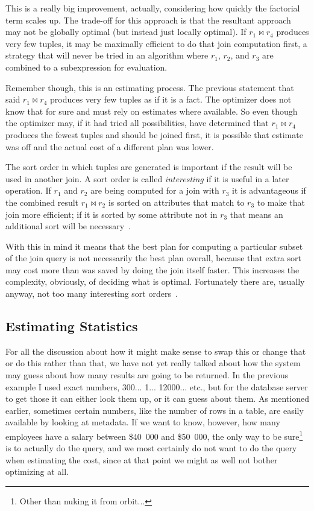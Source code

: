 This is a really big improvement, actually, considering how quickly the factorial term scales up. The trade-off for this approach is that the resultant approach may not be globally optimal (but instead just locally optimal). If $r_{1} \bowtie r_{4}$ produces very few tuples, it may be maximally efficient to do that join computation first, a strategy that will never be tried in an algorithm where $r_{1}$, $r_{2}$, and $r_{3}$ are combined to a subexpression for evaluation. 

Remember though, this is an estimating process. The previous statement that said $r_{1} \bowtie r_{4}$ produces very few tuples as if it is a fact. The optimizer does not know that for sure and must rely on estimates where available. So even though the optimizer may, if it had tried all possibilities, have determined that $r_{1} \bowtie r_{4}$ produces the fewest tuples and should be joined first, it is possible that estimate was off and the actual cost of a different plan was lower.

The sort order in which tuples are generated is important if the result will be used in another join. A sort order is called \textit{interesting} if it is useful in a later operation. If $r_{1}$ and $r_{2}$ are being computed for a join with $r_{3}$ it is advantageous if the combined result $r_{1} \bowtie r_{2}$ is sorted on attributes that match to $r_{3}$ to make that join more efficient; if it is sorted by some attribute not in $r_{3}$ that means an additional sort will be necessary~\cite{dsc}.

With this in mind it means that the best plan for computing a particular subset of the join query is not necessarily the best plan overall, because that extra sort may cost more than was saved by doing the join itself faster. This increases the complexity, obviously, of deciding what is optimal. Fortunately there are, usually anyway, not too many interesting sort orders~\cite{dsc}. 

\subsection*{Estimating Statistics}

For all the discussion about how it might make sense to swap this or change that or do this rather than that, we have not yet really talked about how the system may guess about how many results are going to be returned. In the previous example I used exact numbers, 300... 1... 12000... etc., but for the database server to get those it can either look them up, or it can guess about them. As mentioned earlier, sometimes certain numbers, like the number of rows in a table, are easily available by looking at metadata. If we want to know, however, how many employees have a salary between \$40~000 and \$50~000, the only way to be sure\footnote{Other than nuking it from orbit...} is to actually do the query, and we most certainly do not want to do the query when estimating the cost, since at that point we might as well not bother optimizing at all.


